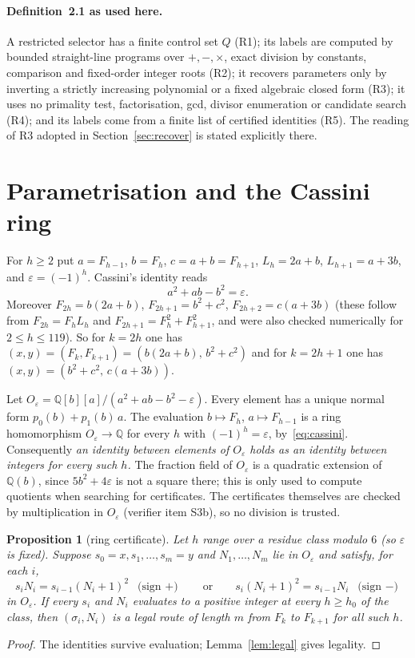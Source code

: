 \documentclass[11pt]{article}
\newtheorem{proposition}[theorem]{Proposition}
\theoremstyle{definition}
\theoremstyle{remark}
\newcommand{\Q}{\mathbb{Q}}
\begin{document}
\paragraph{Definition~2.1 as used here.} A restricted selector has a finite control set $Q$ (R1); its labels are computed by bounded straight-line programs over $+,-,\times$, exact division by constants, comparison and fixed-order integer roots (R2); it recovers parameters only by inverting a strictly increasing polynomial or a fixed algebraic closed form (R3); it uses no primality test, factorisation, gcd, divisor enumeration or candidate search (R4); and its labels come from a finite list of certified identities (R5). The reading of R3 adopted in Section~\ref{sec:recover} is stated explicitly there.

\section{Parametrisation and the Cassini ring}
For $h\ge 2$ put $a=F_{h-1}$, $b=F_h$, $c=a+b=F_{h+1}$, $L_h=2a+b$, $L_{h+1}=a+3b$, and $\varepsilon=(-1)^h$. Cassini's identity reads
\begin{equation}\label{eq:cassini}
a^2+ab-b^2=\varepsilon .
\end{equation}
Moreover $F_{2h}=b(2a+b)$, $F_{2h+1}=b^2+c^2$, $F_{2h+2}=c(a+3b)$ (these follow from $F_{2h}=F_hL_h$ and $F_{2h+1}=F_h^2+F_{h+1}^2$, and were also checked numerically for $2\le h\le 119$). So for $k=2h$ one has $(x,y)=(F_k,F_{k+1})=(b(2a+b),\,b^2+c^2)$ and for $k=2h+1$ one has $(x,y)=(b^2+c^2,\,c(a+3b))$.

Let $O_\varepsilon=\Q[b][a]/(a^2+ab-b^2-\varepsilon)$. Every element has a unique normal form $p_0(b)+p_1(b)\,a$. The evaluation $b\mapsto F_h$, $a\mapsto F_{h-1}$ is a ring homomorphism $O_\varepsilon\to\Q$ for every $h$ with $(-1)^h=\varepsilon$, by~\eqref{eq:cassini}. Consequently \emph{an identity between elements of $O_\varepsilon$ holds as an identity between integers for every such $h$.} The fraction field of $O_\varepsilon$ is a quadratic extension of $\Q(b)$, since $5b^2+4\varepsilon$ is not a square there; this is only used to compute quotients when searching for certificates. The certificates themselves are checked by multiplication in $O_\varepsilon$ (verifier item S3b), so no division is trusted.

\begin{proposition}[ring certificate]\label{prop:cert}
Let $h$ range over a residue class modulo $6$ (so $\varepsilon$ is fixed). Suppose $s_0=x,s_1,\dots,s_m=y$ and $N_1,\dots,N_m$ lie in $O_\varepsilon$ and satisfy, for each $i$,
\[
s_iN_i=s_{i-1}(N_i+1)^2\ \text{ (sign $+$)}\qquad\text{or}\qquad s_i(N_i+1)^2=s_{i-1}N_i\ \text{ (sign $-$)}
\]
in $O_\varepsilon$. If every $s_i$ and $N_i$ evaluates to a positive integer at every $h\ge h_0$ of the class, then $(\sigma_i,N_i)$ is a legal route of length $m$ from $F_k$ to $F_{k+1}$ for all such $h$.
\end{proposition}
\begin{proof}
The identities survive evaluation; Lemma~\ref{lem:legal} gives legality.
\end{proof}
\end{document}
